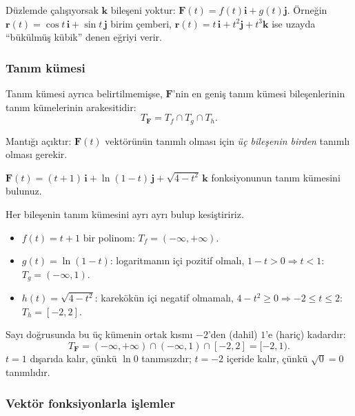 Düzlemde çalışıyorsak $\mathbf k$ bileşeni yoktur: $\mathbf F(t)=f(t)\mathbf i+g(t)\mathbf j$. Örneğin
$\mathbf r(t)=\cos t\,\mathbf i+\sin t\,\mathbf j$ birim çemberi, $\mathbf r(t)=t\,\mathbf i+t^2\mathbf j+t^3\mathbf k$ ise
uzayda ``bükülmüş kübik'' denen eğriyi verir.

\subsubsection{Tanım kümesi}

\begin{teorem}
Tanım kümesi ayrıca belirtilmemişse, $\mathbf F$'nin en geniş tanım kümesi bileşenlerinin tanım kümelerinin arakesitidir:
\[ T_{\mathbf F}=T_f\cap T_g\cap T_h . \]
\end{teorem}

Mantığı açıktır: $\mathbf F(t)$ vektörünün tanımlı olması için \emph{üç bileşenin birden} tanımlı olması gerekir.

\begin{soru}
$\mathbf F(t)=(t+1)\,\mathbf i+\ln(1-t)\,\mathbf j+\sqrt{4-t^2}\,\mathbf k$ fonksiyonunun tanım kümesini bulunuz.
\end{soru}
\begin{cevap}
Her bileşenin tanım kümesini ayrı ayrı bulup kesiştiririz.
\begin{itemize}
\item $f(t)=t+1$ bir polinom: $T_f=(-\infty,+\infty)$.
\item $g(t)=\ln(1-t)$: logaritmanın içi pozitif olmalı, $1-t>0\Rightarrow t<1$: $T_g=(-\infty,1)$.
\item $h(t)=\sqrt{4-t^2}$: karekökün içi negatif olmamalı, $4-t^2\ge 0\Rightarrow -2\le t\le 2$: $T_h=[-2,2]$.
\end{itemize}
Sayı doğrusunda bu üç kümenin ortak kısmı $-2$'den (dahil) $1$'e (hariç) kadardır:
\[ T_{\mathbf F}=(-\infty,+\infty)\cap(-\infty,1)\cap[-2,2]=\boxed{[-2,1)} . \]
$t=1$ dışarıda kalır, çünkü $\ln 0$ tanımsızdır; $t=-2$ içeride kalır, çünkü $\sqrt{0}=0$ tanımlıdır.
\end{cevap}

\subsubsection{Vektör fonksiyonlarla işlemler}


